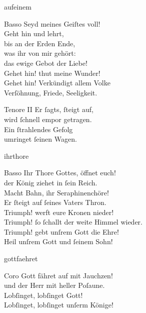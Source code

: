\documentclass[tocstyle=ref-genre]{ees}
\begin{document}
{\begin{movement}{aufeinem}
  \item[Basso]
  Seyd meines Geiſtes voll!\\
  Geht hin und lehrt,\\
  bis an der Erden Ende,\\
  was ihr von mir gehört:\\
  das ewige Gebot der Liebe!\\
  Gehet hin! thut meine Wunder!\\
  Gehet hin! Verkündigt allem Volke\\
  Verſöhnung, Friede, Seeligkeit.

  \item[Tenore II]
  Er ſagts, ſteigt auf,\\
  wird ſchnell empor getragen.\\
  Ein ſtrahlendes Gefolg\\
  umringet ſeinen Wagen.
\end{movement}

\clearpage
\begin{movement}{ihrthore}
  \item[Basso]
  Ihr Thore Gottes, öffnet euch!\\
  der König ziehet in ſein Reich.\\
  Macht Bahn, ihr Seraphinenchöre!\\
  Er ſteigt auf ſeines Vaters Thron.\\
  Triumph! werft eure Kronen nieder!\\
  Triumph! ſo ſchallt der weite Himmel wieder.\\
  Triumph! gebt unſrem Gott die Ehre!\\
  Heil unſrem Gott und ſeinem Sohn!
\end{movement}

\begin{movement}{gottfaehret}
  \item[Coro]
  Gott fähret auf mit Jauchzen!\\
  und der Herr mit heller Poſaune.\\
  Lobſinget, lobſinget Gott!\\
  Lobſinget, lobſinget unſerm Könige!
\end{movement}

}

\eesScore
\end{document}
